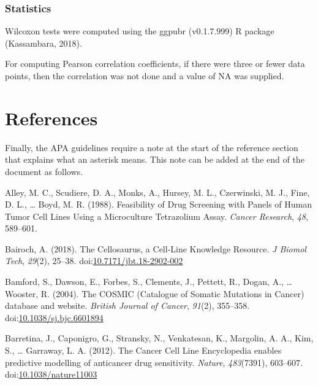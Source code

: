 \documentclass[man]{apa6}
\begin{document}
\subsubsection{Statistics}\label{statistics}

Wilcoxon tests were computed using the ggpubr (v0.1.7.999) R package
(Kassambara, 2018).

For computing Pearson correlation coefficients, if there were three or
fewer data points, then the correlation was not done and a value of NA
was supplied.

\newpage

\section{References}\label{references}

\begingroup
\setlength{\parindent}{-0.5in} \setlength{\leftskip}{0.5in}

Finally, the APA guidelines require a note at the start of the reference
section that explains what an asterisk means. This note can be added at
the end of the document as follows.

\hypertarget{refs}{}
\hypertarget{ref-alley1988}{}
Alley, M. C., Scudiere, D. A., Monks, A., Hursey, M. L., Czerwinski, M.
J., Fine, D. L., \ldots{} Boyd, M. R. (1988). Feasibility of Drug
Screening with Panels of Human Tumor Cell Lines Using a Microculture
Tetrazolium Assay. \emph{Cancer Research}, \emph{48}, 589--601.

\hypertarget{ref-bairoch2018}{}
Bairoch, A. (2018). The Cellosaurus, a Cell-Line Knowledge Resource.
\emph{J Biomol Tech}, \emph{29}(2), 25--38.
doi:\href{https://doi.org/10.7171/jbt.18-2902-002}{10.7171/jbt.18-2902-002}

\hypertarget{ref-bamford2004}{}
Bamford, S., Dawson, E., Forbes, S., Clements, J., Pettett, R., Dogan,
A., \ldots{} Wooster, R. (2004). The COSMIC (Catalogue of Somatic
Mutations in Cancer) database and website. \emph{British Journal of
Cancer}, \emph{91}(2), 355--358.
doi:\href{https://doi.org/10.1038/sj.bjc.6601894}{10.1038/sj.bjc.6601894}

\hypertarget{ref-barretina2012}{}
Barretina, J., Caponigro, G., Stransky, N., Venkatesan, K., Margolin, A.
A., Kim, S., \ldots{} Garraway, L. A. (2012). The Cancer Cell Line
Encyclopedia enables predictive modelling of anticancer drug
sensitivity. \emph{Nature}, \emph{483}(7391), 603--607.
doi:\href{https://doi.org/10.1038/nature11003}{10.1038/nature11003}
\end{document}
